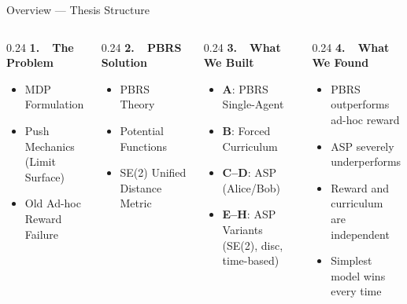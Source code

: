 \documentclass[aspectratio=169,xcolor=dvipsnames,t]{beamer}
\begin{document}
\begin{frame}[t]{Overview — Thesis Structure}
  \vspace*{-0.35cm}
  \footnotesize
  \begin{columns}[T,onlytextwidth]
    \begin{column}{0.24\textwidth}
      {\textbf{\color{hlblue}1.\ \ The Problem}}
      \begin{itemize}
        \item MDP Formulation
        \item Push Mechanics \\ (Limit Surface)
        \item Old Ad-hoc Reward \\ Failure
      \end{itemize}
    \end{column}
    \begin{column}{0.24\textwidth}
      {\textbf{\color{hlblue}2.\ \ PBRS Solution}}
      \begin{itemize}
        \item PBRS Theory
        \item Potential Functions
        \item SE(2) Unified \\ Distance Metric
      \end{itemize}
    \end{column}
    \begin{column}{0.24\textwidth}
      {\textbf{\color{hlblue}3.\ \ What We Built}}
      \begin{itemize}
        \item \textbf{A}: PBRS Single-Agent
        \item \textbf{B}: Forced Curriculum
        \item \textbf{C–D}: ASP (Alice/Bob)
        \item \textbf{E–H}: ASP Variants \\ (SE(2), disc, time-based)
      \end{itemize}
    \end{column}
    \begin{column}{0.24\textwidth}
      {\textbf{\color{hlgreen}4.\ \ What We Found}}
      \begin{itemize}
        \item PBRS outperforms \\ ad-hoc reward
        \item ASP severely \\ underperforms
        \item Reward and curriculum \\ are independent
        \item Simplest model wins \\ every time
      \end{itemize}
    \end{column}
  \end{columns}
\end{frame}
\end{document}
